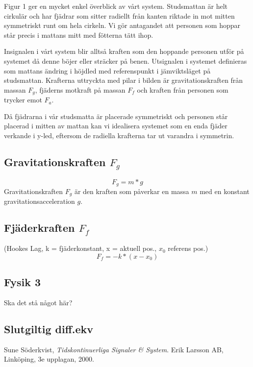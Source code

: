 \documentclass[10pt,a4paper]{article}
\begin{document}
Figur 1 ger en mycket enkel överblick av vårt system. Studsmattan är helt cirkulär och har fjädrar som sitter radiellt från kanten riktade in mot mitten symmetriskt runt om hela cirkeln. Vi gör antagandet att personen som hoppar står precis i mattans mitt med fötterna tätt ihop.


Insignalen i vårt system blir alltså kraften som den hoppande personen utför på systemet då denne böjer eller sträcker på benen. Utsignalen i systemet definieras som mattans ändring i höjdled med referenspunkt i jämviktsläget på studsmattan.
Krafterna uttryckta med pilar i bilden är gravitationskraften från massan $F_g$, fjäderns motkraft på massan $F_f$ och kraften från personen som trycker emot $F_a$.

Då fjädrarna i vår studsmatta är placerade symmetriskt och personen står placerad i mitten av mattan kan vi idealisera systemet som en enda fjäder verkande i y-led, eftersom de radiella krafterna tar ut varandra i symmetrin.

\subsection{Gravitationskraften $F_g$}

\begin{equation}
F_g = m * g
\end{equation}
Gravitationskraften $F_g$ är den kraften som påverkar en massa $m$ med en konstant gravitationsacceleration $g$. 

\subsection{Fjäderkraften $F_f$}

(Hookes Lag, k = fjäderkonstant, x = aktuell pos., $x_0$ referens pos.)
\begin{equation}
F_f = - k * (x - x_0)
\end{equation}

\subsection{Fysik 3}

Ska det stå något här?

\subsection{Slutgiltig diff.ekv}

\newpage

\begin{thebibliography}{9}

  Sune Söderkvist,
  \emph{Tidskontinuerliga Signaler \& System}.
  \linebreak
  Erik Larsson AB, Linköping,
  3e upplagan,
  2000.

\end{thebibliography}
\end{document}
